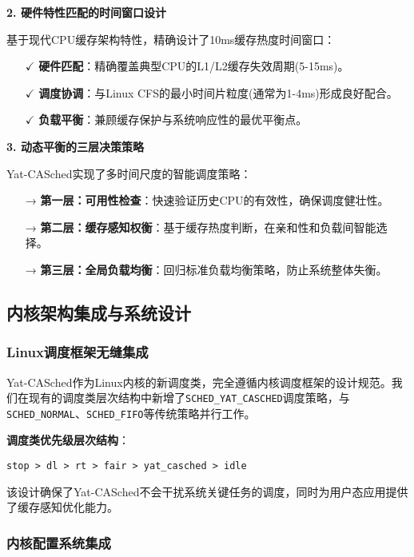 \textbf{2. 硬件特性匹配的时间窗口设计}

基于现代CPU缓存架构特性，精确设计了10ms缓存热度时间窗口：
\begin{itemize}
    \item[$\checkmark$] \textbf{硬件匹配}：精确覆盖典型CPU的L1/L2缓存失效周期(5-15ms)。
    \item[$\checkmark$] \textbf{调度协调}：与Linux CFS的最小时间片粒度(通常为1-4ms)形成良好配合。
    \item[$\checkmark$] \textbf{负载平衡}：兼顾缓存保护与系统响应性的最优平衡点。
\end{itemize}

\textbf{3. 动态平衡的三层决策策略}

Yat-CASched实现了多时间尺度的智能调度策略：
\begin{itemize}
    \item[→] \textbf{第一层：可用性检查}：快速验证历史CPU的有效性，确保调度健壮性。
    \item[→] \textbf{第二层：缓存感知权衡}：基于缓存热度判断，在亲和性和负载间智能选择。
    \item[→] \textbf{第三层：全局负载均衡}：回归标准负载均衡策略，防止系统整体失衡。
\end{itemize}

\subsection{内核架构集成与系统设计}

\subsubsection{Linux调度框架无缝集成}

Yat-CASched作为Linux内核的新调度类，完全遵循内核调度框架的设计规范。我们在现有的调度类层次结构中新增了\texttt{SCHED\_YAT\_CASCHED}调度策略，与\texttt{SCHED\_NORMAL}、\texttt{SCHED\_FIFO}等传统策略并行工作。

\textbf{调度类优先级层次结构}：
\begin{center}
\texttt{stop > dl > rt > fair > yat\_casched > idle}
\end{center}

该设计确保了Yat-CASched不会干扰系统关键任务的调度，同时为用户态应用提供了缓存感知优化能力。

\subsubsection{内核配置系统集成}


